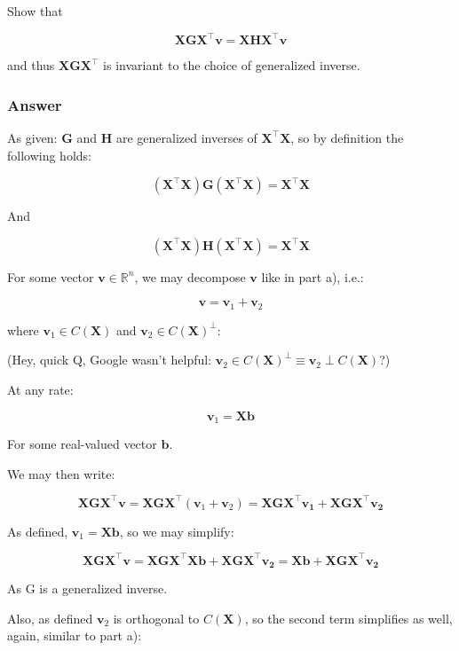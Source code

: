 \documentclass[
]{article}
\begin{document}
Show that

\[
\boldsymbol{X G X^\top v = X H X^\top v}
\]

and thus \(\boldsymbol{X G X^\top}\) is invariant to the choice of
generalized inverse.

\subsubsection{Answer}\label{answer-1}

As given: \(\boldsymbol{G}\) and \(\boldsymbol{H}\) are generalized
inverses of \(\boldsymbol{X}^{\top} \boldsymbol{X}\), so by definition
the following holds:

\[
(\boldsymbol{X}^{\top} \boldsymbol{X}) \boldsymbol{G} (\boldsymbol{X}^{\top} \boldsymbol{X}) = \boldsymbol{X}^{\top} \boldsymbol{X}
\]

And

\[
(\boldsymbol{X}^{\top} \boldsymbol{X}) \boldsymbol{H} (\boldsymbol{X}^{\top} \boldsymbol{X}) = \boldsymbol{X}^{\top} \boldsymbol{X}
\]

For some vector \(\boldsymbol{v} \in \mathbb{R}^n\), we may decompose
\(\boldsymbol{v}\) like in part a), i.e.:

\[
\boldsymbol{v} = \boldsymbol{v}_1 + \boldsymbol{v}_2
\]

where \(\boldsymbol{v}_1 \in C(\boldsymbol{X})\) and
\(\boldsymbol{v}_2 \in C(\boldsymbol{X})^{\perp}\):

(Hey, quick Q, Google wasn't helpful:
\(\boldsymbol{v}_2 \in C(\boldsymbol{X})^{\perp} \equiv \boldsymbol{v}_2 \perp C(\boldsymbol{X})\)?)

At any rate:

\[
\boldsymbol{v}_1 = \boldsymbol{X} \boldsymbol{b}
\]

For some real-valued vector \(\boldsymbol{b}\).

We may then write:

\[
\boldsymbol{X G X^\top v} = \boldsymbol{X G X^\top} (\boldsymbol{v}_1 + \boldsymbol{v}_2) = \boldsymbol{X G X^\top v_1} + \boldsymbol{X G X^\top v_2}
\]

As defined, \(\boldsymbol{v}_1 = \boldsymbol{X} \boldsymbol{b}\), so we
may simplify:

\[
\boldsymbol{X G X^\top v} = \boldsymbol{X G X^\top X b} + \boldsymbol{X G X^\top v_2} = \boldsymbol{X b} + \boldsymbol{X G X^\top v_2}
\]

As G is a generalized inverse.

Also, as defined \(\boldsymbol{v}_2\) is orthogonal to
\(C(\boldsymbol{X})\), so the second term simplifies as well, again,
similar to part a):
\end{document}
